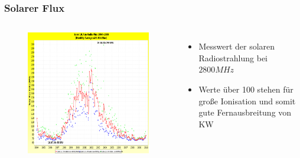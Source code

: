 \begin{frame}
  \frametitle{Solarer Flux}
  \begin{columns}
    \begin{center}
      \begin{figure}
        \includegraphics[width=.7\textwidth,height=.7\textheight,keepaspectratio]{a08/Solar_10_7_cm_Radio_Flux.png}
      \end{figure}
    \end{center}
    \begin{itemize}
      \item Messwert der solaren Radiostrahlung bei $2800 MHz$
      \item Werte über 100 stehen für große Ionisation und somit gute Fernausbreitung von KW
    \end{itemize}
  \end{columns}
\end{frame}


